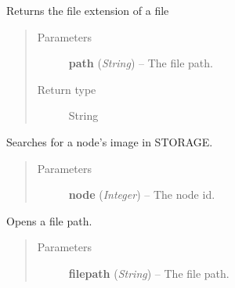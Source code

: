 \documentclass[letterpaper,10pt,english]{sphinxmanual}
\begin{document}

\begin{fulllineitems}
\label{filesystem:filesystem.get_file_extension}
Returns the file extension of a file
\begin{quote}\begin{description}
\item[{Parameters}] \leavevmode
\textbf{path} (\emph{String}) -- The file path.

\item[{Return type}] \leavevmode
String

\end{description}\end{quote}

\end{fulllineitems}


\begin{fulllineitems}
\label{filesystem:filesystem.get_node_image}
Searches for a node's image in STORAGE.
\begin{quote}\begin{description}
\item[{Parameters}] \leavevmode
\textbf{node} (\emph{Integer}) -- The node id.

\end{description}\end{quote}

\end{fulllineitems}


\begin{fulllineitems}
\label{filesystem:filesystem.open_file}
Opens a file path.
\begin{quote}\begin{description}
\item[{Parameters}] \leavevmode
\textbf{filepath} (\emph{String}) -- The file path.

\end{description}\end{quote}

\end{fulllineitems}
\end{document}
